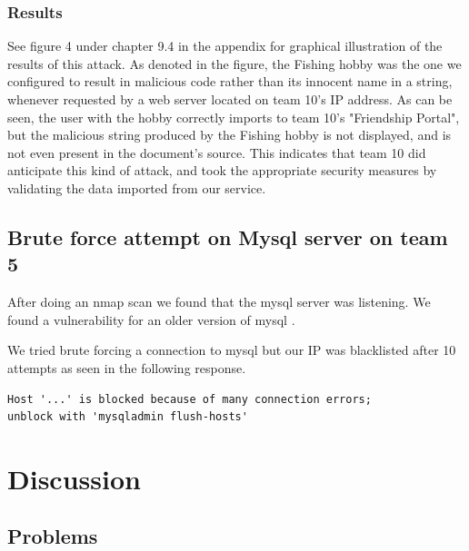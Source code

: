 \documentclass[a4paper]{article}
\begin{document}
\subsubsection{Results}
See figure 4 under chapter 9.4 in the appendix for graphical illustration of the results of this attack. As denoted in the figure, the Fishing hobby was the one we configured to result in malicious code rather than its innocent name in a string, whenever requested by a web server located on team 10's IP address. As can be seen, the user with the hobby correctly imports to team 10's "Friendship Portal", but the malicious string produced by the Fishing hobby is not displayed, and is not even present in the document's source. This indicates that team 10 did anticipate this kind of attack, and took the appropriate security measures by validating the data imported from our service.


\subsection{Brute force attempt on Mysql server on team 5}
After doing an nmap scan we found that the mysql server was listening.
We found a vulnerability for an older version of mysql \cite{Mysql2012}. 

We tried brute forcing a connection to mysql but our IP was blacklisted after 10 attempts as seen in the following response.
\begin{verbatim}
Host '...' is blocked because of many connection errors; 
unblock with 'mysqladmin flush-hosts'
\end{verbatim}

\section{Discussion}


\subsection{Problems}
\end{document}
